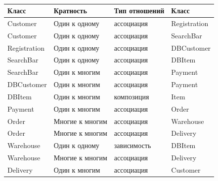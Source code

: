 \begin{longtable}{|p{}
	|p{}
	|p{}
	|p{}
	|}
	\caption{}
	\label{tabular:interactions}\\

	\hline \textbf{Класс} & \textbf{Кратность}
		& \textbf{Тип отношений} & \textbf{Класс} \\ \hline
	\endhead

	Customer & Один к одному & ассоциация & Registration \\ \hline
	Customer & Один к одному & ассоциация & SearchBar \\ \hline
	Registration & Один к одному & ассоциация & DBCustomer \\ \hline
	SearchBar & Один к одному & ассоциация & DBItem \\ \hline
	SearchBar & Один к многим & ассоциация & Payment \\ \hline
	DBCustomer & Один к многим & ассоциация & Payment \\ \hline
	DBItem & Один к многим & композиция & Item \\ \hline
	Payment & Один к многим & ассоциация & Order \\ \hline
	Order & Многие к многим & ассоциация & Warehouse \\ \hline
	Order & Многие к многим & ассоциация & Delivery \\ \hline
	Warehouse & Один к одному & зависимость & DBItem \\ \hline
	Warehouse & Многие к многим & ассоциация & Delivery \\ \hline
	Delivery & Один к многим & ассоциация & Customer \\ \hline
\end{longtable}

